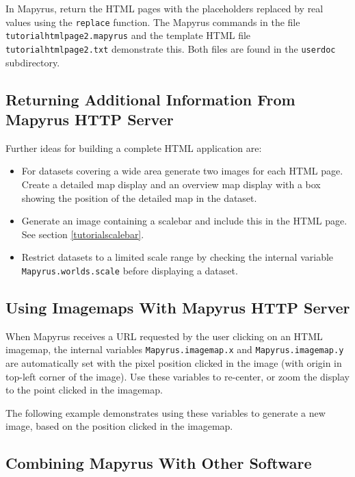 In Mapyrus, return the HTML pages with the placeholders
replaced by real values using the
\texttt{replace}
function.  The Mapyrus commands in the file \texttt{tutorialhtmlpage2.mapyrus}
and the template HTML file \texttt{tutorialhtmlpage2.txt}
demonstrate this.  Both files are found in the
\texttt{userdoc} subdirectory.

\subsection{Returning Additional Information From Mapyrus HTTP Server}

Further ideas for building a complete HTML application are:

\begin{itemize}
\item
For datasets covering a wide area generate two images for
each HTML page.  Create a detailed map display and an overview map display
with a box showing the position of the detailed map in the dataset.

\item
Generate an image containing a scalebar
and include this in the HTML page.  See section \ref{tutorialscalebar}.

\item
Restrict datasets to a limited scale range by checking the
internal variable
\texttt{Mapyrus.worlds.scale} before displaying a dataset.
\end{itemize}

\subsection{Using Imagemaps With Mapyrus HTTP Server}

When Mapyrus receives a URL requested by the user
clicking on an HTML imagemap, the
internal variables
\texttt{Mapyrus.imagemap.x} and
\texttt{Mapyrus.imagemap.y} are automatically set with the pixel position
clicked in the image (with origin in top-left corner of the image).
Use these variables to re-center, or zoom the display to the
point clicked in the imagemap.

The following example demonstrates
using these variables to generate a new image, based on the
position clicked in the imagemap.



\subsection{Combining Mapyrus With Other Software}

